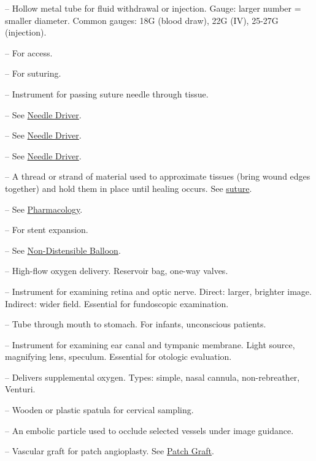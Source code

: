 -- Hollow metal tube for fluid withdrawal or injection. Gauge: larger number = smaller diameter. Common gauges: 18G (blood draw), 22G (IV), 25-27G (injection).

-- For access.

-- For suturing.

-- Instrument for passing suture needle through tissue.

-- See \hyperlink{Needle Driver}{Needle Driver}.

-- See \hyperlink{Needle Driver}{Needle Driver}.

-- See \hyperlink{Needle Driver}{Needle Driver}.


-- A thread or strand of material used to approximate tissues (bring wound edges together) and hold them in place until healing occurs. See \hyperlink{Suture}{suture}.


-- See \hyperlink{Pharmacology}{Pharmacology}.

-- For stent expansion.

-- See \hyperlink{Non-Distensible Balloon}{Non-Distensible Balloon}.

-- High-flow oxygen delivery. Reservoir bag, one-way valves.


-- Instrument for examining retina and optic nerve. Direct: larger, brighter image. Indirect: wider field. Essential for fundoscopic examination.

-- Tube through mouth to stomach. For infants, unconscious patients.

-- Instrument for examining ear canal and tympanic membrane. Light source, magnifying lens, speculum. Essential for otologic evaluation.

-- Delivers supplemental oxygen. Types: simple, nasal cannula, non-rebreather, Venturi.

-- Wooden or plastic spatula for cervical sampling.

-- An embolic particle used to occlude selected vessels under image guidance.

-- Vascular graft for patch angioplasty. See \hyperlink{Patch Graft}{Patch Graft}.

